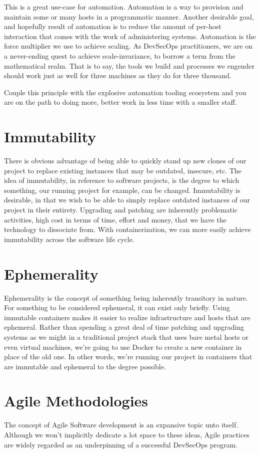\justify
This is a great use-case for automation. Automation is a way
to provision and maintain some or many hosts in a programmatic manner. Another
desirable goal, and hopefully result of automation is to reduce the amount of
per-host interaction that comes with the work of administering systems.
Automation is the force multiplier we use to achieve scaling.
As DevSecOps practitioners, we are on a never-ending quest to achieve 
scale-invariance, 
to borrow a term from the mathematical realm. That is to say, the tools we
build and processes we engender should work just as well for three machines
as they do for three thousand.

\justify 
Couple this principle with the explosive automation tooling ecosystem and you
are on the path to doing more, better work in less time with a smaller staff. 

\section{Immutability}

\justify
There is obvious advantage of being able to quickly stand up new clones
of our project to replace existing instances that may be outdated,
insecure, etc. The idea of immutability,
in reference to software projects, is the degree to which something, our
running project for example, can be changed. Immutability is desirable,
in that we wish to be able to simply replace outdated instances of our
project in their entirety. Upgrading and patching are inherently
problematic activities, high cost in terms of time, effort and money,
that we have the technology to dissociate from. With containerization,
we can more easily achieve immutability across the software life cycle.

\section{Ephemerality}

\justify
Ephemerality is the concept of something being inherently
transitory in nature. For something to be considered ephemeral, it can exist
only briefly. Using immutable containers makes it easier to realize
infrastructure and hosts that are ephemeral. Rather than spending a
great deal of time patching and upgrading systems as we might in a traditional
project stack that uses bare metal hosts or even virtual machines, we're going to
use Docker to create a new container in place of the old one. In other
words, we're running our project in containers that are immutable and
ephemeral to the degree possible.

\section{Agile Methodologies}

\justify
The concept of Agile Software development is an expansive topic
unto itself. Although we won't implicitly dedicate a lot space to these
ideas, Agile practices are widely regarded as an underpinning of a successful
DevSecOps program. 

